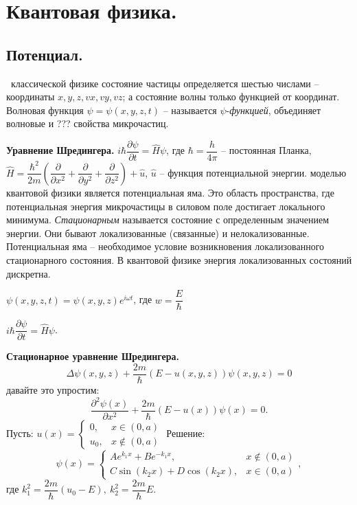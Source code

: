 \documentclass[9pt]{article}
\begin{document}
\section{Квантовая физика.}

\subsection{Потенциал.}

\ 
 классической физике состояние частицы определяется шестью числами -- координаты \(x,y,z,vx,vy,vz\); а состояние волны только функцией от координат. Волновая функция \(\psi=\psi(x,y,z,t)\) -- называется \(\psi\)-\textit{функцией}, объединяет волновые и ??? свойства микрочастиц.
\par\textbf{Уравнение Шредингера.} \(i\hbar\dfrac{\partial \psi}{\partial t}=\hat{H}\psi\), где \(\hbar=\dfrac{h}{4\pi}\) -- постоянная Планка, \(\hat{H}=\dfrac{\hbar^2}{2m}\left(\dfrac{\partial}{\partial x^2}+\dfrac{\partial}{\partial y^2}+\dfrac{\partial}{\partial z^2}\right)+\hat{u}\), \(\hat{u}\) -- функция потенциальной энергии.
\parСледующей моделью квантовой физики является потенциальная яма. Это область пространства, где потенциальная энергия микрочастицы в силовом поле достигает локального минимума. \textit{Стационарным} называется состояние с определенным значением энергии. Они бывают локализованные (связанные) и нелокализованные. Потенциальная яма -- необходимое условие возникновения локализованного стационарного состояния. В квантовой физике энергия локализованных состояний дискретна.
\par\(\psi(x,y,z,t)=\psi(x,y,z)e^{i\omega t}\), где \(w=\dfrac{E}{\hbar}\)
\par\(i\hbar\dfrac{\partial \psi}{\partial t}=\hat H\psi\).
\par\textbf{Стационарное уравнение Шредингера.}
\[\Delta\psi(x,y,z)+\dfrac{2m}{\hbar}(E-u(x,y,z))\psi(x,y,z)=0\]
давайте это упростим:
\[\dfrac{\partial^2\psi(x)}{\partial x^2}+\dfrac{2m}{\hbar}(E-u(x))\psi(x)=0.\]
Пусть: \(u(x)=\left\{
\begin{array}{ll}
    0, & x\in(0,a) \\
    u_0, & x\notin(0,a)
\end{array}\right.\)
Решение:
\[\psi(x)=\left\{
\begin{array}{ll}
    Ae^{k_1x}+Be^{-k_1x}, & x\notin(0,a) \\
    C\sin(k_2x)+D\cos(k_2x), & x\in(0,a)
\end{array}\right.,\]
где \(k_1^2=\dfrac{2m}{\hbar}(u_0-E),\ k_2^2=\dfrac{2m}{\hbar}E\).
\end{document}

